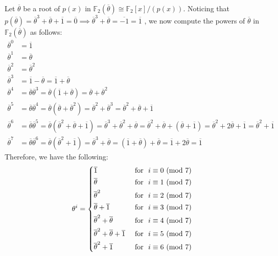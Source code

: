 Let $\overline{\theta}$ be a root of $p(x)$ in $\mathbb{F}_2(\overline{\theta}) \cong \mathbb{F}_2[x]/(p(x))$. Noticing that $p(\overline{\theta}) = \overline{\theta}^3 + \overline{\theta} + \overline{1} = \overline{0} \implies \overline{\theta}^3 + \overline{\theta} = \overline{-1} = \overline{1}$ , we now compute the powers of $\overline{\theta}$ in $\mathbb{F}_2(\overline{\theta})$ as follows:
\begin{align*}
    \overline{\theta}^0 &= \overline{1} \\
    \overline{\theta}^1 &= \overline{\theta} \\
    \overline{\theta}^2 &= \overline{\theta}^2 \\
    \overline{\theta}^3 &= \overline{1} - \overline{\theta} = \overline{1} + \overline{\theta} \\
    \overline{\theta}^4 &= \overline{\theta}\overline{\theta}^3 = \overline{\theta}(\overline{1} + \overline{\theta}) = \overline{\theta} + \overline{\theta}^2 \\
    \overline{\theta}^5 &= \overline{\theta}\overline{\theta}^4 = \overline{\theta}(\overline{\theta} + \overline{\theta}^2) = \overline{\theta}^2 + \overline{\theta}^3 = \overline{\theta}^2 + \overline{\theta} + \overline{1} \\
    \overline{\theta}^6 &= \overline{\theta}\overline{\theta}^5 = \overline{\theta}(\overline{\theta}^2 + \overline{\theta} + \overline{1}) = \overline{\theta}^3 + \overline{\theta}^2 + \overline{\theta} = \overline{\theta}^2 + \overline{\theta} + (\overline{\theta} + \overline{1}) = \overline{\theta}^2 + 2\overline{\theta} + \overline{1} = \overline{\theta}^2 + \overline{1} \\
    \overline{\theta}^7 &= \overline{\theta}\overline{\theta}^6 = \overline{\theta}(\overline{\theta}^2 + \overline{1}) = \overline{\theta}^3 + \overline{\theta} = (\overline{1} + \overline{\theta}) + \overline{\theta} = \overline{1} + 2\overline{\theta} = \overline{1}
\end{align*}
Therefore, we have the following:
\begin{equation*}
    \theta^i = 
\begin{cases*}
    \overline{1} & \text{ for } $i \equiv 0 \text{ (mod 7)}$ \\
    \overline{\theta} & \text{ for } $i \equiv 1 \text{ (mod 7)}$ \\
    \overline{\theta}^2 & \text{ for } $i \equiv 2 \text{ (mod 7)}$ \\
    \overline{\theta} + \overline{1} & \text{ for } $i \equiv 3 \text{ (mod 7)}$ \\
    \overline{\theta}^2 + \overline{\theta} & \text{ for } $i \equiv 4 \text{ (mod 7)}$ \\
    \overline{\theta}^2 + \overline{\theta} + \overline{1} & \text{ for } $i \equiv 5 \text{ (mod 7)}$ \\
    \overline{\theta}^2 + \overline{1} & \text{ for } $i \equiv 6 \text{ (mod 7)}$
\end{cases*}
\end{equation*}